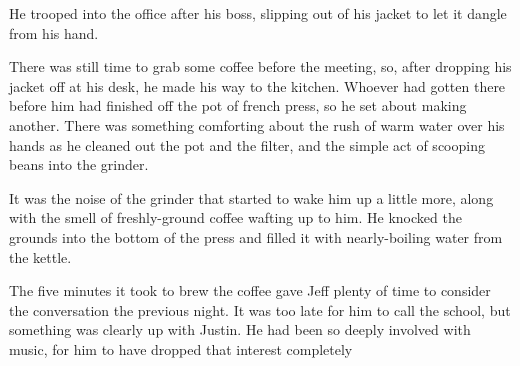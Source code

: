 He trooped into the office after his boss, slipping out of his jacket to let it dangle from his hand.

There was still time to grab some coffee before the meeting, so, after dropping his jacket off at his desk, he made his way to the kitchen.  Whoever had gotten there before him had finished off the pot of french press, so he set about making another.  There was something comforting about the rush of warm water over his hands as he cleaned out the pot and the filter, and the simple act of scooping beans into the grinder.

It was the noise of the grinder that started to wake him up a little more, along with the smell of freshly-ground coffee wafting up to him.  He knocked the grounds into the bottom of the press and filled it with nearly-boiling water from the kettle.

The five minutes it took to brew the coffee gave Jeff plenty of time to consider the conversation the previous night.  It was too late for him to call the school, but something was clearly up with Justin.  He had been so deeply involved with music, for him to have dropped that interest completely 
